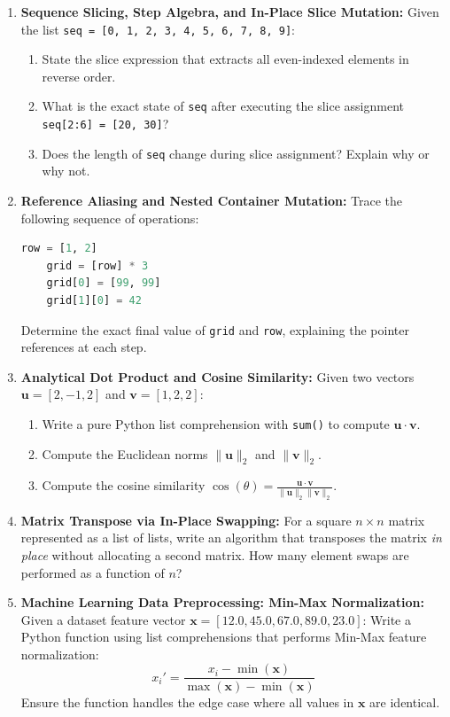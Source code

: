 \begin{enumerate}
    \item \textbf{Sequence Slicing, Step Algebra, and In-Place Slice Mutation:}
    Given the list \texttt{seq = [0, 1, 2, 3, 4, 5, 6, 7, 8, 9]}:
    \begin{enumerate}
        \item State the slice expression that extracts all even-indexed elements in reverse order.
        \item What is the exact state of \texttt{seq} after executing the slice assignment \texttt{seq[2:6] = [20, 30]}?
        \item Does the length of \texttt{seq} change during slice assignment? Explain why or why not.
    \end{enumerate}

    \item \textbf{Reference Aliasing and Nested Container Mutation:}
    Trace the following sequence of operations:
    \begin{lstlisting}[language=Python]
    row = [1, 2]
    grid = [row] * 3
    grid[0] = [99, 99]
    grid[1][0] = 42
    \end{lstlisting}
    Determine the exact final value of \texttt{grid} and \texttt{row}, explaining the pointer references at each step.

    \item \textbf{Analytical Dot Product and Cosine Similarity:}
    Given two vectors $\mathbf{u} = [2, -1, 2]$ and $\mathbf{v} = [1, 2, 2]$:
    \begin{enumerate}
        \item Write a pure Python list comprehension with \texttt{sum()} to compute $\mathbf{u} \cdot \mathbf{v}$.
        \item Compute the Euclidean norms $\|\mathbf{u}\|_2$ and $\|\mathbf{v}\|_2$.
        \item Compute the cosine similarity $\cos(\theta) = \frac{\mathbf{u} \cdot \mathbf{v}}{\|\mathbf{u}\|_2 \|\mathbf{v}\|_2}$.
    \end{enumerate}

    \item \textbf{Matrix Transpose via In-Place Swapping:}
    For a square $n \times n$ matrix represented as a list of lists, write an algorithm that transposes the matrix \emph{in place} without allocating a second matrix. How many element swaps are performed as a function of $n$?

    \item \textbf{Machine Learning Data Preprocessing: Min-Max Normalization:}
    Given a dataset feature vector $\mathbf{x} = [12.0, 45.0, 67.0, 89.0, 23.0]$:
    Write a Python function using list comprehensions that performs Min-Max feature normalization:
    \begin{equation}
    x_i' = \frac{x_i - \min(\mathbf{x})}{\max(\mathbf{x}) - \min(\mathbf{x})}
    \end{equation}
    Ensure the function handles the edge case where all values in $\mathbf{x}$ are identical.
\end{enumerate}

